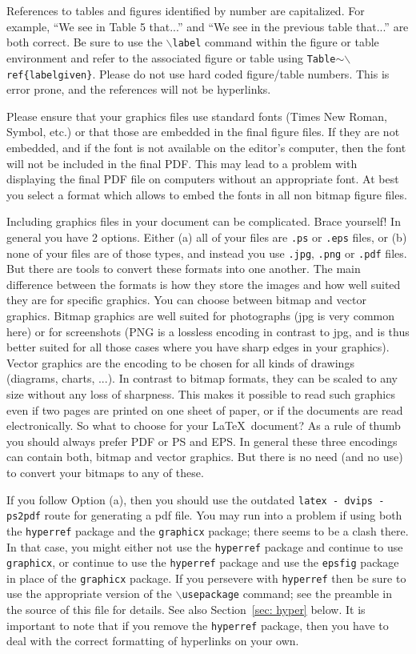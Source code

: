 \documentclass{wscpaperproc}
\theoremstyle{wsc}
\begin{document}
References to tables and figures identified by number are capitalized. For example, ``We see in Table 5 that...'' and ``We see in the previous table that...'' are both correct. Be sure to use the {\tt $\backslash$label} command within the figure or table environment and refer to the associated figure or table using {\tt Table$\sim \backslash$ref\{labelgiven\}}.
Please do not use hard coded figure/table numbers. This is error prone, and the references will not be hyperlinks.

Please ensure that your graphics files use standard fonts (Times New Roman, Symbol, etc.) or that those are embedded in the final figure files.
If they are not embedded, and if the font is not available on the editor's computer, then the font will not be included in the final PDF.
This may lead to a problem with displaying the final PDF file on computers without an appropriate font.
At best you select a format which allows to embed the fonts in all non bitmap figure files.

Including graphics files in your document can be complicated. Brace yourself! In general you have 2 options. Either (a) all of your files are {\tt .ps} or {\tt .eps} files, or (b) none of your files are of those types, and instead you use {\tt .jpg}, {\tt .png} or {\tt .pdf} files.
But there are tools to convert these formats into one another. The main difference between the formats is how they store the images and how well suited they are for specific graphics. You can choose between bitmap and vector graphics.
Bitmap graphics are well suited for photographs (jpg is very common here) or for screenshots (PNG is a lossless encoding in contrast to jpg, and is thus better suited for all those cases where you have sharp edges in your graphics).
Vector graphics are the encoding to be chosen for all kinds of drawings (diagrams, charts, ...). In contrast to bitmap formats, they can be scaled to any size without any loss of sharpness. This makes it possible to read such graphics even if two pages are printed on one sheet of paper, or if the documents are read electronically.
So what to choose for your \LaTeX\ document? As a rule of thumb you should always prefer PDF or PS and EPS.
In general these three encodings can contain both, bitmap and vector graphics. But there is no need (and no use) to convert your bitmaps to any of these.

If you follow Option (a), then you should use the outdated {\tt latex - dvips - ps2pdf} route for generating a pdf file. You may run into a problem if using both the {\tt hyperref} package and the {\tt graphicx} package; there seems to be a clash there.
In that case, you might either not use the {\tt hyperref} package and continue to use {\tt graphicx}, or continue to use the {\tt hyperref} package and use the {\tt epsfig} package in place of the {\tt graphicx} package.
If you persevere with {\tt hyperref} then be sure to use the appropriate version of the {\tt $\backslash$usepackage} command; see the preamble in the source of this file for details. See also Section~\ref{sec: hyper} below. It is important to note that if you remove the {\tt hyperref} package, then you have to deal with the correct formatting of hyperlinks on your own.
\end{document}
